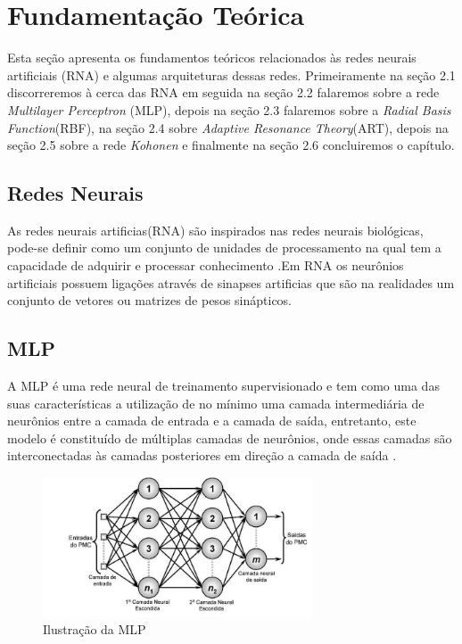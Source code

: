 \chapter{Fundamentação Teórica}
\label{cap:fundamentacao-teorica}

Esta seção apresenta os fundamentos teóricos relacionados às redes
neurais artificiais (RNA) e algumas arquiteturas dessas redes. Primeiramente na seção 2.1 discorreremos à cerca das RNA em seguida na seção 2.2 falaremos sobre a rede \textit{Multilayer Perceptron} (MLP), depois na seção 2.3 falaremos sobre a \textit{Radial Basis Function}(RBF), na seção 2.4 sobre \textit{Adaptive Resonance Theory}(ART), depois na seção 2.5 sobre a rede \textit{Kohonen} e finalmente na seção 2.6 concluiremos o capítulo.

\section{Redes Neurais}
\label{sec:redes-neurais}

As redes neurais artificias(RNA) são inspirados nas redes neurais biológicas, pode-se definir como um conjunto de unidades de processamento na qual tem a capacidade de adquirir e processar conhecimento \cite{silva2010redes}.Em RNA os neurônios artificiais possuem ligações através de sinapses artificias que são na realidades um conjunto de vetores ou matrizes de pesos sinápticos.








\section{MLP}
\label{sec:multilayer-perceptron}

A MLP é uma rede neural de treinamento supervisionado e tem como uma das suas características a utilização de no mínimo uma camada intermediária de neurônios entre a camada de entrada e a camada de saída, entretanto, este modelo é constituído de múltiplas camadas de neurônios, onde essas camadas são interconectadas às camadas posteriores em direção a camada de saída \cite{gardner1998artificial} .


	\begin{figure}[t]
	\centering
	\includegraphics[width=8cm]{figuras/mlp.jpg}
	\caption{Ilustração da MLP}
\end{figure}

